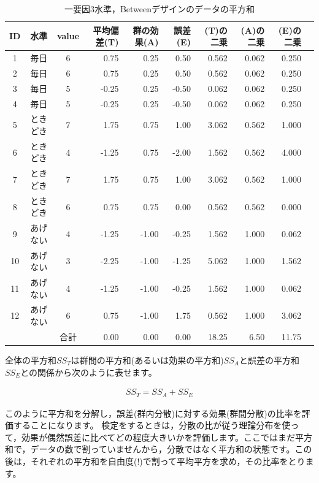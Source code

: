 \documentclass{ltjbook}
\begin{document}
\begin{table}[ht]
	\centering
	\caption{一要因3水準，Betweenデザインのデータの平方和}
	\begin{tabular}{cccrrrrrrr}
		\hline
		ID & 水準 & value & 平均偏差(T)   & 群の効果(A)   & 誤差(E)     & (T)の二乗 & (A)の二乗 & (E)の二乗 \\
		\hline
		1 & 毎日 & 6 & 0.75  & 0.25  & 0.50  & 0.562   & 0.062 & 0.250 \\
		2 & 毎日 & 6 & 0.75  & 0.25  & 0.50  & 0.562   & 0.062 & 0.250 \\
		3 & 毎日 & 5 & -0.25 & 0.25  & -0.50 & 0.062   & 0.062 & 0.250 \\
		4 & 毎日 & 5 & -0.25 & 0.25  & -0.50 & 0.062   & 0.062 & 0.250 \\
		5 & ときどき & 7 & 1.75  & 0.75  & 1.00  & 3.062   & 0.562 & 1.000 \\
		6 & ときどき & 4 & -1.25 & 0.75  & -2.00 & 1.562   & 0.562 & 4.000 \\
		7 & ときどき & 7 & 1.75  & 0.75  & 1.00  & 3.062   & 0.562 & 1.000 \\
		8 & ときどき & 6 & 0.75  & 0.75  & 0.00  & 0.562   & 0.562 & 0.000 \\
		9 & あげない & 4 & -1.25 & -1.00 & -0.25 & 1.562   & 1.000 & 0.062 \\
		10 & あげない & 3 & -2.25 & -1.00 & -1.25 & 5.062   & 1.000 & 1.562 \\
		11 & あげない & 4 & -1.25 & -1.00 & -0.25 & 1.562   & 1.000 & 0.062 \\
		12 & あげない & 6 & 0.75  & -1.00 & 1.75  & 0.562   & 1.000 & 3.062 \\
		\hline\hline
		 & & 合計 & 0.00   & 0.00   & 0.00   & 18.25   & 6.50  & 11.75 \\\hline
	\end{tabular}
	\label{tbl:18_03}
\end{table}

全体の平方和$SS_T$は群間の平方和(あるいは効果の平方和)$SS_A$と誤差の平方和$SS_E$との関係から次のように表せます。

\begin{align}
SS_T = SS_A + SS_E
\end{align}

このように平方和を分解し，誤差(群内分散)に対する効果(群間分散)の比率を評価することになります。
検定をするときは，分散の比が従う理論分布を使って，効果が偶然誤差に比べてどの程度大きいかを評価します。ここではまだ平方和で，データの数で割っていませんから，分散ではなく平方和の状態です。この後は，それぞれの平方和を自由度(!)で割って平均平方を求め，その比率をとります。
\end{document}
